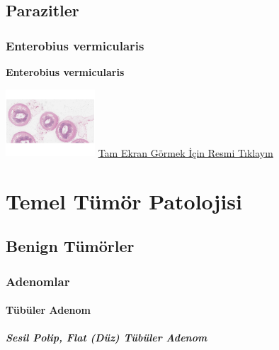 \documentclass[
  letterpaper,
  DIV=11,
  numbers=noendperiod]{scrreprt}
\begin{document}
\hypertarget{sec-parazitler}{%
\chapter{Parazitler}\label{sec-parazitler}}

\hypertarget{sec-enterobius-vermicularis}{%
\section{Enterobius vermicularis}\label{sec-enterobius-vermicularis}}

\textbf{Enterobius vermicularis}

\href{https://images.patolojiatlasi.com/enterobius-vermicularis/HE.html}{\includegraphics[width=0.25\textwidth,height=\textheight]{./screenshots/enterobius-vermicularis_screenshot.png}}
\href{https://images.patolojiatlasi.com/enterobius-vermicularis/HE.html}{Tam
Ekran Görmek İçin Resmi Tıklayın}

\part{Temel Tümör Patolojisi}

\hypertarget{sec-benign-tumorler}{%
\chapter{Benign Tümörler}\label{sec-benign-tumorler}}

\hypertarget{sec-adenomlar}{%
\section{Adenomlar}\label{sec-adenomlar}}

\hypertarget{sec-tubuler-adenom}{%
\subsection{Tübüler Adenom}\label{sec-tubuler-adenom}}

\hypertarget{sec-sesil-polip}{%
\subsubsection{Sesil Polip, Flat (Düz) Tübüler
Adenom}\label{sec-sesil-polip}}
\end{document}
